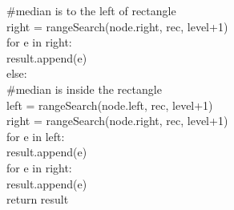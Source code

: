 \documentclass[english, fontsize=12pt, paper=a4, twoside=false, draft=true, pagesize=auto, version=last, DIV=16]{scrartcl}
\theoremstyle{break}
\begin{document}
\hspace*{10mm}\hspace*{10mm}\hspace*{10mm}\#median is to the left of rectangle\\
\hspace*{10mm}\hspace*{10mm}\hspace*{10mm}right = rangeSearch(node.right, rec, level+1)\\
\hspace*{10mm}\hspace*{10mm}\hspace*{10mm}for e in right:\\
\hspace*{10mm}\hspace*{10mm}\hspace*{10mm}\hspace*{10mm}result.append(e)\\
\hspace*{10mm}\hspace*{10mm}else:\\
\hspace*{10mm}\hspace*{10mm}\hspace*{10mm}\#median is inside the rectangle\\
\hspace*{10mm}\hspace*{10mm}\hspace*{10mm}left = rangeSearch(node.left, rec, level+1)\\
\hspace*{10mm}\hspace*{10mm}\hspace*{10mm}right = rangeSearch(node.right, rec, level+1)\\
\hspace*{10mm}\hspace*{10mm}\hspace*{10mm}for e in left:\\
\hspace*{10mm}\hspace*{10mm}\hspace*{10mm}\hspace*{10mm}result.append(e)\\
\hspace*{10mm}\hspace*{10mm}\hspace*{10mm}for e in right:\\
\hspace*{10mm}\hspace*{10mm}\hspace*{10mm}\hspace*{10mm}result.append(e)\\
\hspace*{10mm}return result\\
\end{document}
